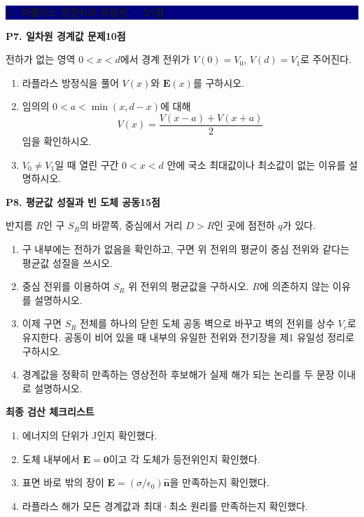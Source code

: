 \documentclass[11pt,a4paper]{article}
\newcommand{\vect}[1]{\symbf{#1}}
\newcommand{\unit}[1]{\hat{\symbf{#1}}}
\newcommand{\problem}[3]{%
  \par\vspace{3.5mm}
  {\large\bfseries\color{navy}#1\hfill{\normalsize\color{blue}#2점}}\par
  \smallskip #3\par
}
\newcommand{\sectionbar}[1]{%
  \par\vspace{3mm}
  \colorbox{navy}{\parbox{0.965\linewidth}{\color{white}\bfseries\large #1}}
  \par\vspace{1mm}
}
\begin{document}
\sectionbar{C. 라플라스 방정식과 유일성 · 25점}

\problem{P7. 일차원 경계값 문제}{10}{%
전하가 없는 영역 $0<x<d$에서 경계 전위가 $V(0)=V_0$, $V(d)=V_1$로 주어진다.
\begin{enumerate}[label=(\alph*)]
  \item 라플라스 방정식을 풀어 $V(x)$와 $\vect E(x)$를 구하시오.
  \item 임의의 $0<a<\min(x,d-x)$에 대해
  \[
    V(x)=\frac{V(x-a)+V(x+a)}{2}
  \]
  임을 확인하시오.
  \item $V_0\ne V_1$일 때 열린 구간 $0<x<d$ 안에 국소 최대값이나 최소값이 없는 이유를 설명하시오.
\end{enumerate}
}

\problem{P8. 평균값 성질과 빈 도체 공동}{15}{%
반지름 $R$인 구 $S_R$의 바깥쪽, 중심에서 거리 $D>R$인 곳에 점전하 $q$가 있다.
\begin{enumerate}[label=(\alph*)]
  \item 구 내부에는 전하가 없음을 확인하고, 구면 위 전위의 평균이 중심 전위와 같다는 평균값 성질을 쓰시오.
  \item 중심 전위를 이용하여 $S_R$ 위 전위의 평균값을 구하시오. $R$에 의존하지 않는 이유를 설명하시오.
  \item 이제 구면 $S_R$ 전체를 하나의 닫힌 도체 공동 벽으로 바꾸고 벽의 전위를 상수 $V_c$로 유지한다. 공동이 비어 있을 때 내부의 유일한 전위와 전기장을 제1 유일성 정리로 구하시오.
  \item 경계값을 정확히 만족하는 영상전하 후보해가 실제 해가 되는 논리를 두 문장 이내로 설명하시오.
\end{enumerate}
}

\begin{checkbox}
\textbf{최종 검산 체크리스트}
\begin{enumerate}[label={\color{blue}□},leftmargin=7mm,itemsep=1pt]
  \item 에너지의 단위가 J인지 확인했다.
  \item 도체 내부에서 $\vect E=\vect 0$이고 각 도체가 등전위인지 확인했다.
  \item 표면 바로 밖의 장이 $\vect E=(\sigma/\epsilon_0)\unit n$을 만족하는지 확인했다.
  \item 라플라스 해가 모든 경계값과 최대·최소 원리를 만족하는지 확인했다.
\end{enumerate}
\end{checkbox}
\end{document}
